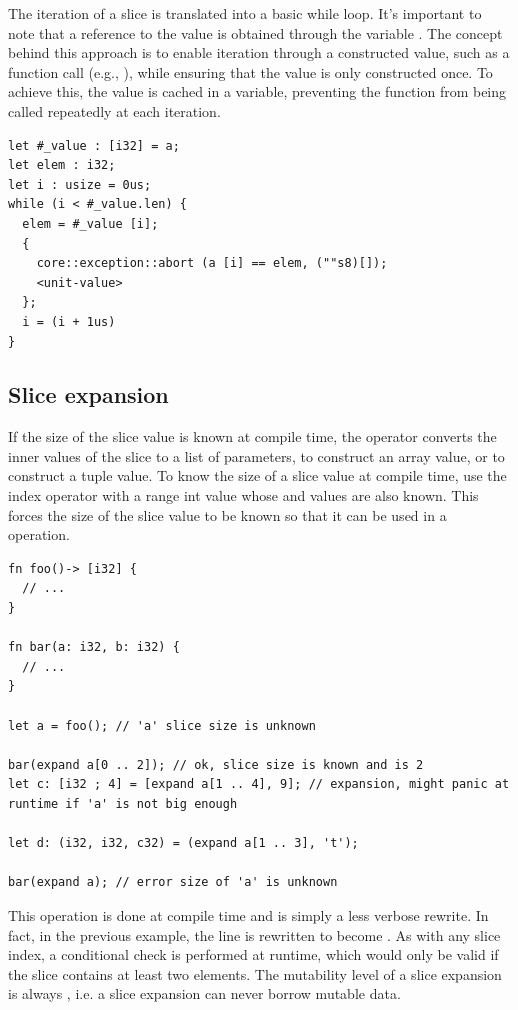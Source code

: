 The iteration of a slice is translated into a basic while loop. It's important
to note that a reference to the value is obtained through the variable
. The concept behind this approach is to enable iteration
through a constructed value, such as a function call (e.g., ), while ensuring that the value is only constructed once. To achieve
this, the value is cached in a variable, preventing the function from being
called repeatedly at each iteration.

\begin{lstlisting}[style=myilVerb]
let #_value : [i32] = a;
let elem : i32;
let i : usize = 0us;
while (i < #_value.len) {
  elem = #_value [i];
  {
    core::exception::abort (a [i] == elem, (""s8)[]);
    <unit-value>
  };
  i = (i + 1us)
}
\end{lstlisting}

\subsection{Slice expansion}
\label{sec:compound:slice_expansion}

If the size of the slice value is known at compile time, the 
operator converts the inner values of the slice to a list of
parameters, to construct an array value, or to construct a tuple value. To know
the size of a slice value at compile time, use the index operator with a range
int value whose  and  values are also known. This forces
the size of the slice value to be known so that it can be used in a
 operation.

\begin{lstlisting}[style=coloredverbatimError]
fn foo()-> [i32] {
  // ...
}

fn bar(a: i32, b: i32) {
  // ...
}

let a = foo(); // 'a' slice size is unknown

bar(expand a[0 .. 2]); // ok, slice size is known and is 2
let c: [i32 ; 4] = [expand a[1 .. 4], 9]; // expansion, might panic at runtime if 'a' is not big enough

let d: (i32, i32, c32) = (expand a[1 .. 3], 't');

bar(expand a); // error size of 'a' is unknown
  \end{lstlisting}

This operation is done at compile time and is simply a less verbose rewrite. In
fact, in the previous example, the line  is
rewritten to become . As with any slice index, a
conditional check is performed at runtime, which would only be valid if the
slice  contains at least two elements. The mutability level of a slice
expansion is always , i.e. a slice expansion can never borrow mutable
data.


